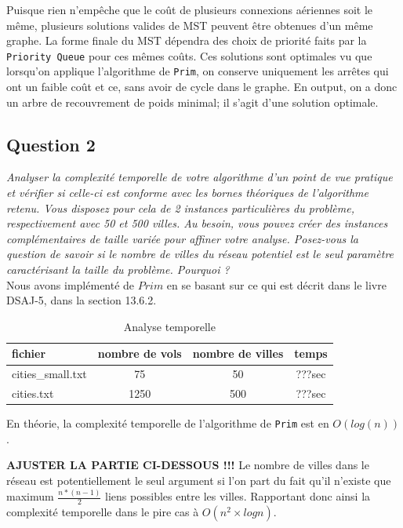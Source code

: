 \documentclass[11pt]{article}
\begin{document}
Puisque rien n'empêche que le coût de plusieurs connexions aériennes soit le même, plusieurs solutions valides de MST peuvent être obtenues d'un même graphe. La forme finale du MST dépendra des choix de priorité faits par la \verb+Priority Queue+ pour ces mêmes coûts.
Ces solutions sont optimales vu que lorsqu'on applique l'algorithme de \verb+Prim+, on conserve uniquement les arrêtes qui ont un faible coût et ce, sans avoir de cycle dans le graphe. En output, on a donc un arbre de recouvrement de poids minimal; il s'agit d'une solution optimale.\\

\subsection*{Question 2}
\textit{Analyser la complexité temporelle de votre algorithme d’un point de vue pratique et vérifier si celle-ci est conforme avec les bornes théoriques de l’algorithme retenu. Vous disposez pour cela de 2 instances particulières du problème, respectivement avec 50 et 500 villes. Au besoin, vous pouvez créer des instances complémentaires de taille variée pour affiner votre analyse. Posez-vous la question de savoir si le nombre de villes du réseau potentiel est le seul paramètre caractérisant la taille du problème. Pourquoi ?} \\

Nous avons implémenté de $Prim$ en se basant sur ce qui est décrit dans le livre DSAJ-5, dans la section 13.6.2.

\begin{table}[ht!]
\centering
\begin{tabular}{l|c|c|c}
fichier & nombre de vols & nombre de villes & temps \\
\hline
cities\_small.txt & 75 & 50 & ???sec \\
cities.txt & 1250 & 500 & ???sec \\
\end{tabular}
\caption{Analyse temporelle}
\end{table}
En théorie, la complexité temporelle de l'algorithme de \verb+Prim+ est en $O(log(n))$.

\textbf{AJUSTER LA PARTIE CI-DESSOUS !!!}
Le nombre de villes dans le réseau est potentiellement le seul argument si l'on part du fait qu'il n'existe que maximum $\frac{n*(n-1)}{2}$ liens possibles entre les villes. Rapportant donc ainsi la complexité temporelle dans le pire cas à $O(n^2 \times log n)$.
\end{document}
